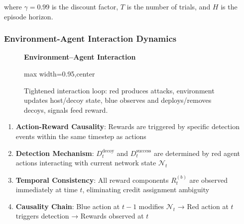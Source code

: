 \documentclass[12pt,oneside]{article}
\begin{document}
where $\gamma = 0.99$ is the discount factor, $T$ is the number of trials, and $H$ is the episode horizon.

\subsubsection{Environment-Agent Interaction Dynamics}

\begin{figure}[H]
\centering
\textbf{Environment--Agent Interaction}
\medskip
\begin{adjustbox}{max width=0.95\linewidth,center}
\end{adjustbox}
\caption{Tightened interaction loop: red produces attacks, environment updates host/decoy state, blue observes and deploys/removes decoys, signals feed reward.}
\label{fig:environment_interaction}
\end{figure}

\begin{enumerate}
\item \textbf{Action-Reward Causality}: Rewards are triggered by specific detection events within the same timestep as actions
\item \textbf{Detection Mechanism}: $D_t^{\text{decoy}}$ and $D_t^{\text{success}}$ are determined by red agent actions interacting with current network state $\mathcal{N}_t$
\item \textbf{Temporal Consistency}: All reward components $R_t^{(b)}$ are observed immediately at time $t$, eliminating credit assignment ambiguity
\item \textbf{Causality Chain}: Blue action at $t-1$ modifies $\mathcal{N}_t$ → Red action at $t$ triggers detection → Rewards observed at $t$
\end{enumerate}
\end{document}

